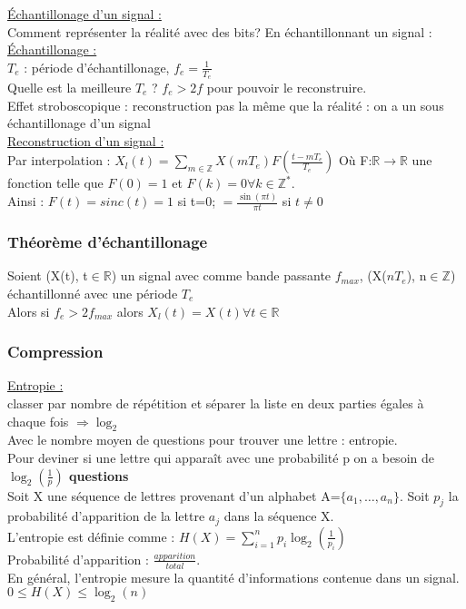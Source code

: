\documentclass[../main.tex]{subfiles}
\begin{document}
\quad \underline{Échantillonage d'un signal :}\\
Comment représenter la réalité avec des bits? En échantillonnant un signal :\\
\underline{Échantillonage :}\\
$T_e$ : période d'échantillonage, $f_e = \frac{1}{T_e}$\\
Quelle est la meilleure $T_e$ ? $f_e > 2f$ pour pouvoir le reconstruire.\\
Effet stroboscopique : reconstruction pas la même que la réalité : on a un sous échantillonage d'un signal\\

\underline{Reconstruction d'un signal :}\\
Par interpolation : $X_l(t) = \sum_{m\in \mathbb{Z}} X(mT_e) F(\frac{t-mT_e}{T_e})$ Où F:$\mathbb{R}\rightarrow\mathbb{R}$ une fonction telle que $F(0) = 1$ et $F(k)=0 \forall k \in \mathbb{Z}^*$.\\
Ainsi : $F(t) = sinc(t) = 1$ si t=0; $=\frac{\sin{(\pi t)}}{\pi t}$ si $t\neq 0$\\

\subsubsection{Théorème d'échantillonage}
Soient (X(t), t$\in \mathbb{R}$) un signal avec comme bande passante $f_{max}$, (X($nT_e$), n$\in \mathbb{Z}$) échantillonné avec une période $T_e$\\
Alors si $f_e > 2f_{max}$ alors $X_l(t) = X(t)  \forall t \in \mathbb{R}$\\

\subsubsection{Compression}
\quad \underline{Entropie :}\\
classer par nombre de répétition et séparer la liste en deux parties égales à chaque fois $\Rightarrow \log_2$\\
Avec le nombre moyen de questions pour trouver une lettre : entropie.\\
Pour deviner si une lettre qui apparaît avec une probabilité p on a besoin de \textbf{$\log_2(\frac{1}{p})$ questions}\\

Soit X une séquence de lettres provenant d'un alphabet A=$\{a_1, \dots, a_n\}$. Soit $p_j$ la probabilité d'apparition de la lettre $a_j$ dans la séquence X.\\
L'entropie est définie comme : $H(X) = \sum_{i=1}^n p_i \log_2(\frac{1}{p_i})$\\
Probabilité d'apparition : $\frac{apparition}{total}$.\\
En général, l'entropie mesure la quantité d'informations contenue dans un signal.\\
$0\leq H(X) \leq \log_2(n)$\\
\end{document}
